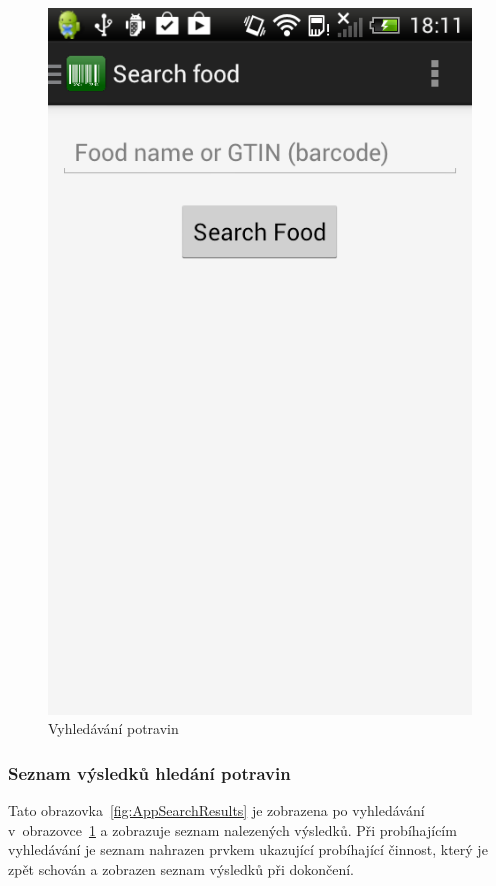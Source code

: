 \documentclass[thesis=B,czech]{FITthesis}[2013/10/20]
\begin{document}
\begin{figure}[H]
  \centering
  \includegraphics[scale=0.4]{screenshots/app_search.png}
  \caption{Vyhledávání potravin}
  \label{fig:AppSearch}
\end{figure}

\clearpage

\subsubsection{Seznam výsledků hledání potravin}

Tato obrazovka~\ref{fig:AppSearchResults} je zobrazena po vyhledávání v~obrazovce~\ref{fig:AppSearch} a zobrazuje seznam nalezených výsledků. Při probíhajícím vyhledávání je seznam nahrazen prvkem ukazující probíhající činnost, který je zpět schován a zobrazen seznam výsledků při dokončení.
\end{document}
